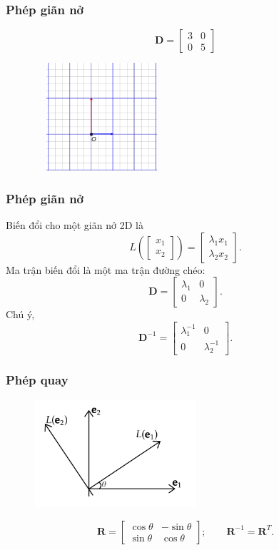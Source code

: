 \begin{frame}
    \frametitle{Phép giãn nở}
    \[\mathbf{D}=
    \begin{bmatrix}
        3&0\\0&5
    \end{bmatrix}\]
    \begin{figure}
        \centering
        \includegraphics[width=5cm, height=4cm]{Slides/Figure/LT6.png}
    \end{figure}
\end{frame}
\begin{frame}
\frametitle{Phép giãn nở}
    Biến đổi cho một giãn nở 2D là 
\[L\left(\begin{bmatrix}
    x_1 \\x_2
\end{bmatrix}\right)=\begin{bmatrix}
    \lambda_1 x_1 \\\lambda_2 x_2
\end{bmatrix}.\]
Ma trận biến đổi là một ma trận đường chéo:
\[\mathbf{D}=\begin{bmatrix}
    \lambda_1 &0\\0&\lambda_2
\end{bmatrix}.\]
Chú ý, \[\mathbf{D}^{-1}=\begin{bmatrix}
    \lambda_{1}^{-1} &0\\0&\lambda_{2}^{-1}
\end{bmatrix}.\]
\end{frame}
\begin{frame}
    \frametitle{Phép quay}
    \begin{figure}[H]
        \centering
        \includegraphics[width=6cm, height=4cm]{Slides/Figure/rotation.png}
    \end{figure}
    \[\mathbf{R}=\begin{bmatrix}
    \cos\theta &-\sin\theta\\
    \sin\theta &\cos\theta
\end{bmatrix};\qquad \mathbf{R}^{-1}=\mathbf{R}^T .\]
\end{frame}
